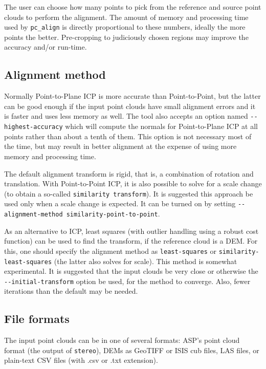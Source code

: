 The user can choose how many points to pick from the reference and
source point clouds to perform the alignment. The amount of memory and
processing time used by \texttt{pc\_align} is directly proportional to
these numbers, ideally the more points the better. Pre-cropping to
judiciously chosen regions may improve the accuracy and/or run-time.

\subsection{Alignment method}
\label{align-method}

Normally Point-to-Plane ICP is more accurate than Point-to-Point, but
the latter can be good enough if the input point clouds have small
alignment errors and it is faster and uses less memory as well.  The
tool also accepts an option named \texttt{-\/-highest-accuracy} which
will compute the normals for Point-to-Plane ICP at all points rather
than about a tenth of them. This option is not necessary most of the
time, but may result in better alignment at the expense of using more
memory and processing time.

The default alignment transform is rigid, that is, a combination of
rotation and translation. With Point-to-Point ICP, it is also possible
to solve for a scale change (to obtain a so-called \texttt{similarity
transform}). It is suggested this approach be used only when a scale
change is expected. It can be turned on by setting
\texttt{-\/-alignment-method similarity-point-to-point}. 

As an alternative to ICP, least squares (with outlier handling using a
robust cost function) can be used to find the transform, if the
reference cloud is a DEM. For this, one should specify the alignment
method as \texttt{least-squares} or \texttt{similarity-least-squares}
(the latter also solves for scale). This method is somewhat
experimental. It is suggested that the input clouds be very close or
otherwise the \texttt{-\/-initial-transform} option be used, for the
method to converge. Also, fewer iterations than the default may be
needed.

\subsection{File formats}

The input point clouds can be in one of several formats: ASP's point
cloud format (the output of \texttt{stereo}), DEMs as GeoTIFF or ISIS
cub files, LAS files, or plain-text CSV files (with .csv or .txt
extension).

